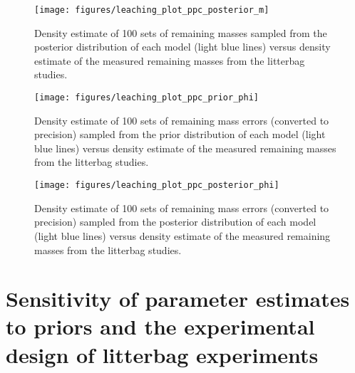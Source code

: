 \documentclass[
  12pt,
]{article}
\begin{document}
\begin{figure}[H]

{\centering \texttt{[image: figures/leaching\_plot\_ppc\_posterior\_m]} 

}

\caption{Density estimate of 100 sets of remaining masses sampled from the posterior distribution of each model (light blue lines) versus density estimate of the measured remaining masses from the litterbag studies.}\label{fig:sup-out-p-sdm-all-models-check-2-1}
\end{figure}



\begin{figure}[H]

{\centering \texttt{[image: figures/leaching\_plot\_ppc\_prior\_phi]} 

}

\caption{Density estimate of 100 sets of remaining mass errors (converted to precision) sampled from the prior distribution of each model (light blue lines) versus density estimate of the measured remaining masses from the litterbag studies.}\label{fig:sup-out-p-sdm-all-models-check-3-1}
\end{figure}



\begin{figure}[H]

{\centering \texttt{[image: figures/leaching\_plot\_ppc\_posterior\_phi]} 

}

\caption{Density estimate of 100 sets of remaining mass errors (converted to precision) sampled from the posterior distribution of each model (light blue lines) versus density estimate of the measured remaining masses from the litterbag studies.}\label{fig:sup-out-p-sdm-all-models-check-4-1}
\end{figure}

\hypertarget{sup-11}{%
\section{Sensitivity of parameter estimates to priors and the experimental design of litterbag experiments}\label{sup-11}}
\end{document}
